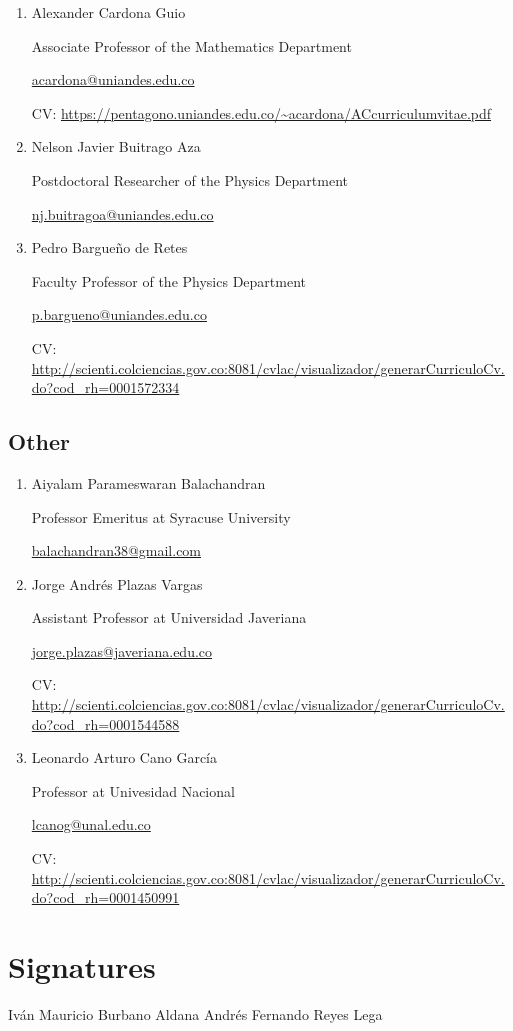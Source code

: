 \documentclass{article}
\begin{document}
\begin{enumerate}

\item Alexander Cardona Guio

Associate Professor of the Mathematics Department

\href{mailto:acardona@uniandes.edu.co}{acardona@uniandes.edu.co}

CV: \url{https://pentagono.uniandes.edu.co/~acardona/ACcurriculumvitae.pdf}

\item Nelson Javier Buitrago Aza

Postdoctoral Researcher of the Physics Department

\href{mailto:nj.buitragoa@uniandes.edu.co}{nj.buitragoa@uniandes.edu.co}

\item Pedro Bargueño de Retes

Faculty Professor of the Physics Department

\href{mailto:p.bargueno@uniandes.edu.co}{p.bargueno@uniandes.edu.co}

CV: \url{http://scienti.colciencias.gov.co:8081/cvlac/visualizador/generarCurriculoCv.do?cod_rh=0001572334}

\end{enumerate}

\subsection*{Other}

\begin{enumerate}

\item Aiyalam Parameswaran Balachandran

Professor Emeritus at Syracuse University

\href{mailto:balachandran38@gmail.com}{balachandran38@gmail.com}

\item Jorge Andrés Plazas Vargas

Assistant Professor at Universidad Javeriana

\href{mailto:jorge.plazas@javeriana.edu.co}
{jorge.plazas@javeriana.edu.co}

CV: \url{http://scienti.colciencias.gov.co:8081/cvlac/visualizador/generarCurriculoCv.do?cod_rh=0001544588}

\item Leonardo Arturo Cano García 

Professor at Univesidad Nacional

\href{mailto:lcanog@unal.edu.co}{lcanog@unal.edu.co}

CV: \url{http://scienti.colciencias.gov.co:8081/cvlac/visualizador/generarCurriculoCv.do?cod_rh=0001450991}

\end{enumerate}

\section*{Signatures}

\vspace{2cm}

Iván Mauricio Burbano Aldana \hspace{2cm} Andrés Fernando Reyes Lega 



\end{document}
